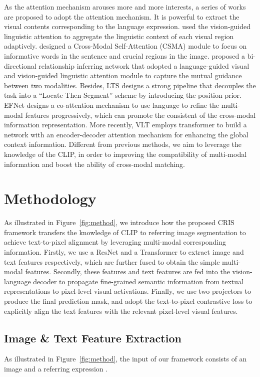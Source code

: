 \documentclass[10pt,twocolumn,letterpaper]{article}
\begin{document}
As the attention mechanism arouses more and more interests, a series of works are proposed to adopt the attention mechanism.
It is powerful to extract the visual contents corresponding to the language expression.
\cite{shi2018key} used the vision-guided linguistic attention to aggregate the linguistic context of each visual region adaptively.
\cite{ye2019cross} designed a Cross-Modal Self-Attention (CSMA) module to focus on informative words in the sentence and crucial regions in the image.
\cite{hu2020bi} proposed a bi-directional relationship inferring network that adopted a language-guided visual and vision-guided linguistic attention module to capture the mutual guidance between two modalities.
Besides, LTS \cite{jing2021locate} designs a strong pipeline that decouples the task into a ``Locate-Then-Segment'' scheme by introducing the position prior.
EFNet \cite{feng2021encoder} designs a co-attention mechanism to use language to refine the multi-modal features progressively,
which can promote the consistent of the cross-modal information representation.
More recently, VLT\cite{ding2021vlt} employs transformer to build a network with an encoder-decoder attention mechanism for enhancing the global context information.
Different from previous methods, we aim to leverage the knowledge of the CLIP, in order to improving the compatibility of multi-modal information and boost the ability of cross-modal matching.
 

\section{Methodology}\label{sec:methods}
As illustrated in Figure~\ref{fig:method}, we introduce how the proposed CRIS framework transfers the knowledge of CLIP to referring image segmentation to achieve text-to-pixel alignment by leveraging multi-modal corresponding information.
Firstly, we use a ResNet \cite{he2016deep} and a Transformer \cite{vaswani2017attention} to extract image and text features respectively, which are further fused to obtain the simple multi-modal features.
Secondly, these features and text features are fed into the vision-language decoder to propagate fine-grained semantic information from textual representations to pixel-level visual activations.
Finally, we use two projectors to produce the final prediction mask, and adopt the text-to-pixel contrastive loss to explicitly align the text features with the relevant pixel-level visual features.

\subsection{Image \& Text Feature Extraction}
As illustrated in Figure~\ref{fig:method}, the input of our framework consists of an image  and a referring expression .
\end{document}
